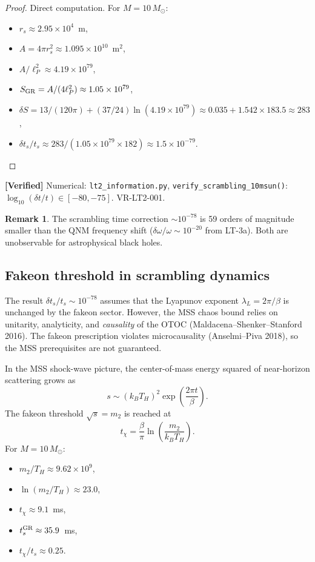 \documentclass[11pt,a4paper]{article}
\theoremstyle{plain}
\theoremstyle{definition}
\newtheorem{remark}[theorem]{Remark}
\newcommand{\verified}[1]{%
  \par\smallskip\noindent
  \colorbox{green!10}{\parbox{\dimexpr\linewidth-2\fboxsep}{%
    \textcolor{green!50!black}{\textbf{[Verified]}} #1}}%
  \par\smallskip}
\begin{document}
\begin{proof}
Direct computation.  For $M = 10\,M_\odot$:
\begin{itemize}
\item $r_s \approx 2.95 \times 10^4$~m,
\item $A = 4\pi r_s^2 \approx 1.095 \times 10^{10}$~m$^2$,
\item $A/\ell_P^2 \approx 4.19 \times 10^{79}$,
\item $S_{\rm GR} = A/(4\ell_P^2) \approx 1.05 \times 10^{79}$,
\item $\delta S = 13/(120\pi) + (37/24)\ln(4.19 \times 10^{79})
       \approx 0.035 + 1.542 \times 183.5 \approx 283$,
\item $\delta t_s/t_s \approx 283 / (1.05 \times 10^{79} \times 182)
       \approx 1.5 \times 10^{-79}$.
\end{itemize}
\end{proof}

\verified{Numerical: \texttt{lt2\_information.py},
  \texttt{verify\_scrambling\_10msun()}: $\log_{10}(\delta t/t) \in [-80, -75]$.
  VR-LT2-001.}

\begin{remark}
The scrambling time correction $\sim 10^{-78}$ is 59 orders of magnitude
smaller than the QNM frequency shift ($\delta\omega/\omega \sim 10^{-20}$
from LT-3a).  Both are unobservable for astrophysical black holes.
\end{remark}

\subsection{Fakeon threshold in scrambling dynamics}

The result $\delta t_s/t_s \sim 10^{-78}$ assumes that the Lyapunov
exponent $\lambda_L = 2\pi/\beta$ is unchanged by the fakeon sector.
However, the MSS chaos bound relies on unitarity, analyticity, and
\emph{causality} of the OTOC (Maldacena--Shenker--Stanford 2016).
The fakeon prescription violates microcausality (Anselmi--Piva 2018),
so the MSS prerequisites are not guaranteed.

In the MSS shock-wave picture, the center-of-mass energy squared of
near-horizon scattering grows as
\begin{equation}
s \sim (k_B T_H)^2 \exp\!\left(\frac{2\pi t}{\beta}\right).
\end{equation}
The fakeon threshold $\sqrt{s} = m_2$ is reached at
\begin{equation}
\label{eq:t-chi}
t_\chi = \frac{\beta}{\pi}\ln\!\left(\frac{m_2}{k_B T_H}\right).
\end{equation}
For $M = 10\,M_\odot$:
\begin{itemize}
\item $m_2/T_H \approx 9.62 \times 10^9$,
\item $\ln(m_2/T_H) \approx 23.0$,
\item $t_\chi \approx 9.1$~ms,
\item $t_s^{\rm GR} \approx 35.9$~ms,
\item $t_\chi / t_s \approx 0.25$.
\end{itemize}
\end{document}
